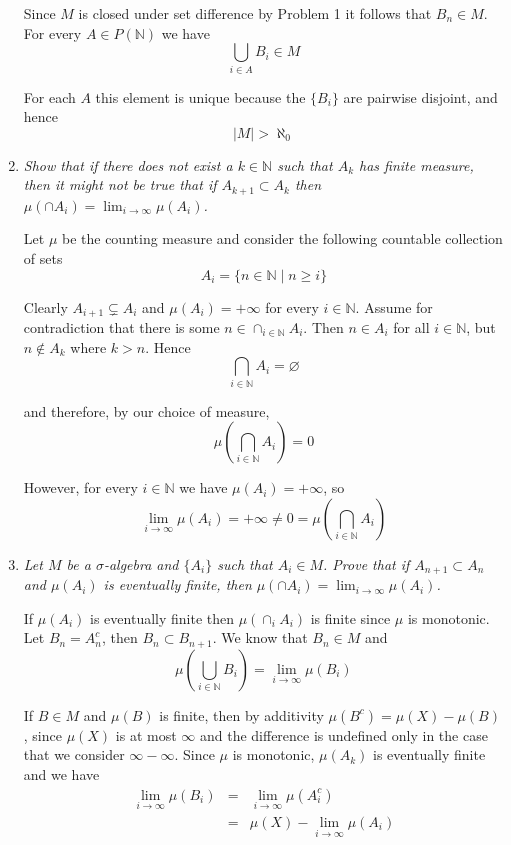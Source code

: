 \documentclass[11pt]{article}
\begin{document}
\begin{enumerate}
Since $M$ is closed under set difference by Problem 1 it follows that $B_n \in M$.  For every $A \in P(\mathbb{N})$ we have
\[
\bigcup_{i \in A} B_i \in M
\]

For each $A$ this element is unique because the $\{B_i\}$ are pairwise disjoint, and hence
\[
|M| > \aleph_0
\]

\item \emph{Show that if there does not exist a $k \in \mathbb{N}$ such that $A_k$ has finite measure, then it might not be true that if $A_{k+1} \subset A_k$ then $\mu\left(\cap A_i\right) = \lim_{i \rightarrow \infty} \mu\left(A_i\right)$.}

Let $\mu$ be the counting measure and consider the following countable collection of sets
\[
A_i = \{n \in \mathbb{N} \mid n \geq  i\}
\]

Clearly $A_{i+1} \subsetneq A_i$ and $\mu(A_i) = +\infty$ for every $i \in \mathbb{N}$. Assume for contradiction that there is some $n \in \cap_{i \in \mathbb{N}} A_i$. Then $n \in A_i$ for all $i \in \mathbb{N}$, but $n \notin A_k$ where $k > n$. Hence
\[
\bigcap_{i \in \mathbb{N}} A_i = \varnothing
\]

and therefore, by our choice of measure, 
\[
\mu\left(\bigcap_{i \in \mathbb{N}} A_i\right) = 0
\]

However, for every $i \in \mathbb{N}$ we have $\mu(A_i) = +\infty$, so
\[
\lim_{i \rightarrow \infty} \mu\left(A_i\right) = +\infty \neq 0 = \mu\left(\bigcap_{i \in \mathbb{N}} A_i\right)
\]


\item \emph{Let $M$ be a $\sigma$-algebra and $\{A_i\}$ such that $A_i \in M$.  Prove that if $A_{n+1} \subset A_n$ and $\mu(A_i)$ is eventually finite, then $\mu\left(\cap A_i\right) = \lim_{i \rightarrow \infty} \mu\left(A_i\right)$.}


If $\mu(A_i)$ is eventually finite then $\mu\left(\cap_i A_i \right)$ is finite since $\mu$ is monotonic.  Let $B_n = A_n^c$, then $B_n \subset B_{n+1}$.  We know that $B_n \in M$ and
\begin{equation}
\label{sigunlim}
\mu\left(\bigcup_{i \in \mathbb{N}} B_i\right) = \lim_{i \rightarrow \infty} \mu(B_i)
\end{equation}

If $B \in M$ and $\mu(B)$ is finite, then by additivity $\mu(B^c) = \mu(X) - \mu(B)$, since $\mu(X)$ is at most $\infty$ and the difference is undefined only in the case that we consider $\infty - \infty.$  Since $\mu$ is monotonic, $\mu(A_k)$ is eventually finite and we have
\begin{eqnarray*}
\lim_{i \rightarrow \infty} \mu(B_i) &=& \lim_{i \rightarrow \infty} \mu(A_i^c) \\
&=& \mu(X) - \lim_{i \rightarrow \infty} \mu(A_i)
\end{eqnarray*}


\end{enumerate}
\end{document}
